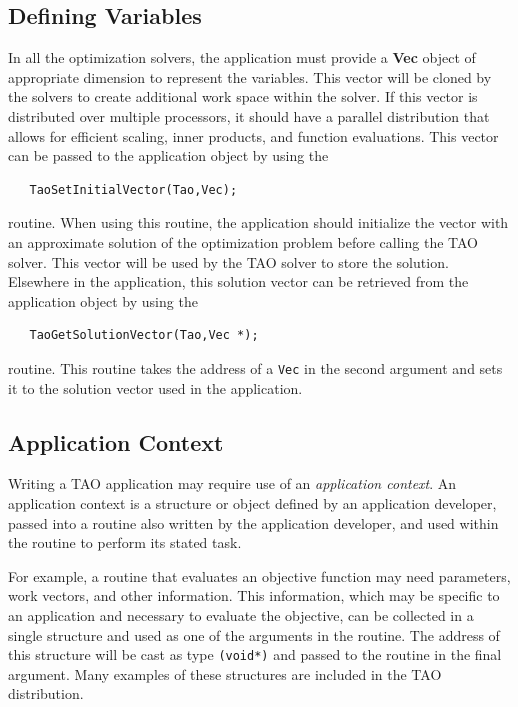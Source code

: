 \documentclass[]{book}
\begin{document}
\subsection{Defining Variables}
In all the optimization solvers, the application must provide
a {\bf Vec} object of appropriate dimension to represent the variables.
This vector will be cloned by the solvers to create additional work
space within the solver.
If this vector is distributed over multiple processors, it
should have a parallel distribution that allows
for efficient scaling, inner products, and
function evaluations.  This vector can be passed to the
application object by using the  %
\begin{verbatim}
   TaoSetInitialVector(Tao,Vec);
\end{verbatim}
routine. 
When using this routine, the application should initialize the vector with
an approximate solution of the optimization problem before calling the
TAO solver.
This vector will be used by the TAO solver to store the solution.
Elsewhere in the application, 
this solution vector can be retrieved from the application object 
by using the  %
\begin{verbatim}
   TaoGetSolutionVector(Tao,Vec *);
\end{verbatim}
routine. 
This routine takes the address of a {\tt Vec} in the second argument and sets it to
the solution vector used in the application.

\subsection{Application Context}  %
Writing a TAO application may require
use of an {\em application context}.
An application context is a structure or object defined by an
application developer, passed
into a routine also written by the application developer, 
and used within the routine to perform its stated task.
 
For example, a routine that evaluates an objective function may need
parameters, work vectors, and other information.   This information,
which may be specific to an application and necessary to evaluate the objective,
can be collected in a single structure and used as one of the
arguments in the routine.
The address of this structure will be cast as type {\tt (void*)} and passed to
the routine in the final argument.
Many examples of these structures are included in the
TAO distribution.
\end{document}
